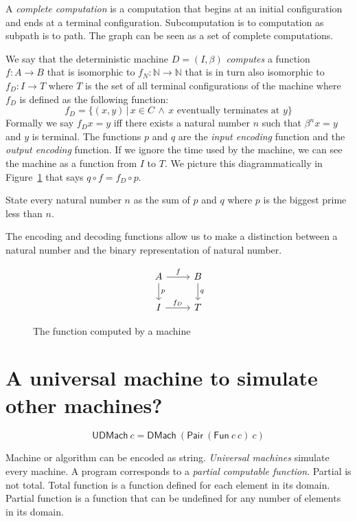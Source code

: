 \documentclass[10pt,statementpaper]{memoir}
\theoremstyle{definition}
\newcommand\Pair[2]{\mathsf{Pair}~#1~#2}
\newcommand\UDMach[1]{\mathsf{UDMach}~#1}
\newcommand\DMach[1]{\mathsf{DMach}~#1}
\newcommand\sfFun{\mathsf{Fun}}
\newcommand\Fun[2]{\sfFun~#1~#2}
\begin{document}
A \emph{complete computation} is a computation that begins at an initial configuration
and ends at a terminal configuration.
Subcomputation is to computation as subpath is to path.
The graph can be seen as a set of complete computations.

We say that the deterministic machine $D = (I,\beta)$ \emph{computes} a function
$f : A \to B$
that is isomorphic to
$f_N : \mathbb{N} \to \mathbb{N}$
that is in turn also isomorphic to
$f_D : I \to T$
where $T$ is the set of all terminal configurations of the machine
where $f_D$ is defined as the following function:
\begin{equation}
    f_D = \{ (x,y) \,|\, x \in C \,\wedge\, x \text{ eventually terminates at } y \}
\end{equation}
Formally we say $f_D x = y$ iff there exists
a natural number $n$ such that $\beta^n x = y$ and $y$ is terminal.
The functions $p$ and $q$ are the \emph{input encoding} function
and the \emph{output encoding} function.
If we ignore the time used by the machine,
we can see the machine as a function from $I$ to $T$.
We picture this diagrammatically in Figure~\ref{f:comp}
that says $q \circ f = f_D \circ p$.

State every natural number $n$ as the sum of $p$ and $q$
where $p$ is the biggest prime less than $n$.

The encoding and decoding functions allow us to make
a distinction between a natural number
and the binary representation of natural number.

\begin{figure}[h]
\[
\begin{tikzcd}
    A \arrow[r, "f"] \arrow[d, "p"] & B \arrow[d, "q"]
    \\
    I \arrow[r, "f_D"] & T
\end{tikzcd}
\]
    \caption{The function computed by a machine}
    \label{f:comp}
\end{figure}

\section{A universal machine to simulate other machines?}

\[
    \UDMach{c} = \DMach{(\Pair{(\Fun{c}{c})}{c})}
\]

Machine or algorithm can be encoded as string.
\emph{Universal machines} simulate every machine.
A program corresponds to a \emph{partial computable function}.
Partial is not total.
Total function is a function defined for each element in its domain.
Partial function is a function that can be undefined for any number of elements in its domain.
\end{document}
